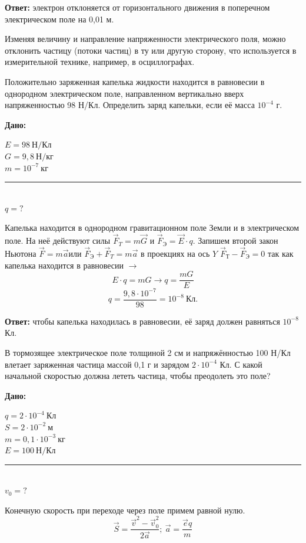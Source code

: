 \documentclass[a6paper, 11pt]{diss_4}
\newcommand{\TNF}{$\vec{F}=m\vec{a}$}
\renewcommand{\'}{\,'}
\begin{document}
\textbf{Ответ:}  электрон отклоняется от горизонтального движения в поперечном электрическом поле на 0,01 м.

Изменяя величину и направление напряженности электрического поля, можно отклонить частицу (потоки частиц) в
ту или другую сторону, что используется в измерительной технике, например, в осциллографах.

Положительно заряженная капелька жидкости находится в равновесии в однородном электрическом поле, направленном  вертикально вверх напряженностью  98 Н/Кл. Определить заряд капельки, если её масса  $10^{-4}$ г.

\hspace{1cm}\textbf{Дано:}\hspace{.3cm}
\parbox[t]{4cm}{
$E = 98\ Н/Кл$\\
$G = 9,8\ Н/кг$\\
$m = 10^{-7}\ кг$\\
\rule{4cm}{.4pt}\\
$q = ?$\\
}

Капелька находится в однородном гравитационном поле Земли и в электрическом поле. На неё действуют
силы $\vec{F}_T=m\vec{G}$ и $\vec{F}_Э=\vec{E}\cdot q$.
Запишем второй закон Ньютона \TNF или $\vec{F}_Э+\vec{F}_T=m\vec{a}$ в проекциях на ось $Y$
$\vec{F}_Т-\vec{F}_Э=0$ так как капелька находится в равновесии $\to$
\[
E\cdot q=mG\to q=\frac{mG}{E}
\]
\[
q=\frac{9,8\cdot10^{-7}}{98}=10^{-8}\ Кл.
\]

\textbf{Ответ:}  чтобы капелька находилась в равновесии, её заряд должен равняться $10^{-8}$ Кл.


В тормозящее электрическое поле толщиной 2 см и напряжённостью 100 Н/Кл влетает заряженная частица массой 0,1 г
и зарядом $2\cdot10^{-4}$ Кл. С какой начальной скоростью должна лететь частица, чтобы преодолеть это поле?

\hspace{1cm}\textbf{Дано:}\hspace{.3cm}
\parbox[t]{4cm}{
$q = 2\cdot10^{-4}\ Кл$\\
$S = 2\cdot10^{-2}\ м$\\
$m = 0,1\cdot10^{-3}\ кг$\\
$E = 100\ Н/Кл$\
\rule{4cm}{.4pt}\\
$v_0 = ?$\\
}


Конечную скорость при переходе через поле примем равной нулю.
\[
\vec{S}=\frac{\vec{v}^2-\vec{v}^2_0}{2\vec{a}};\
\vec{a}=\frac{\vec{e}q}{m}
\]
\end{document}
